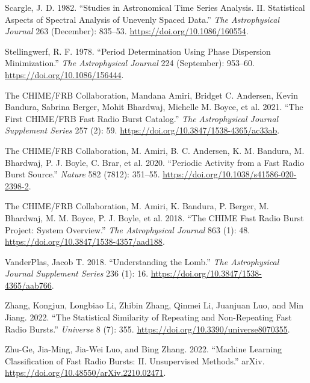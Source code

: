 \documentclass[
  rmp,
  amsmath,
  amssymb,
  preprint]{revtex4-2}
\newlength{\cslhangindent}
\newlength{\cslentryspacingunit} %
\newenvironment{CSLReferences}[2] %
 {%
  \setlength{\parindent}{0pt}
  \ifodd #1
  \let\oldpar\par
  \def\par{\hangindent=\cslhangindent\oldpar}
  \fi
  \setlength{\parskip}{#2\cslentryspacingunit}
 }%
 {}
\begin{document}
\begin{CSLReferences}{1}{0}
\leavevmode{}%
Scargle, J. D. 1982. {``Studies in Astronomical Time Series Analysis.
{II}. {Statistical} Aspects of Spectral Analysis of Unevenly Spaced
Data.''} \emph{The Astrophysical Journal} 263 (December): 835--53.
\url{https://doi.org/10.1086/160554}.

\leavevmode{}%
Stellingwerf, R. F. 1978. {``Period Determination Using Phase Dispersion
Minimization.''} \emph{The Astrophysical Journal} 224 (September):
953--60. \url{https://doi.org/10.1086/156444}.

\leavevmode{}%
The CHIME/FRB Collaboration, Mandana Amiri, Bridget C. Andersen, Kevin
Bandura, Sabrina Berger, Mohit Bhardwaj, Michelle M. Boyce, et al. 2021.
{``The {First CHIME}/{FRB Fast Radio Burst Catalog}.''} \emph{The
Astrophysical Journal Supplement Series} 257 (2): 59.
\url{https://doi.org/10.3847/1538-4365/ac33ab}.

\leavevmode{}%
The CHIME/FRB Collaboration, M. Amiri, B. C. Andersen, K. M. Bandura, M.
Bhardwaj, P. J. Boyle, C. Brar, et al. 2020. {``Periodic Activity from a
Fast Radio Burst Source.''} \emph{Nature} 582 (7812): 351--55.
\url{https://doi.org/10.1038/s41586-020-2398-2}.

\leavevmode{}%
The CHIME/FRB Collaboration, M. Amiri, K. Bandura, P. Berger, M.
Bhardwaj, M. M. Boyce, P. J. Boyle, et al. 2018. {``The {CHIME Fast
Radio Burst Project}: {System Overview}.''} \emph{The Astrophysical
Journal} 863 (1): 48. \url{https://doi.org/10.3847/1538-4357/aad188}.

\leavevmode{}%
VanderPlas, Jacob T. 2018. {``Understanding the
{Lomb}.''} \emph{The Astrophysical
Journal Supplement Series} 236 (1): 16.
\url{https://doi.org/10.3847/1538-4365/aab766}.

\leavevmode{}%
Zhang, Kongjun, Longbiao Li, Zhibin Zhang, Qinmei Li, Juanjuan Luo, and
Min Jiang. 2022. {``The {Statistical Similarity} of {Repeating} and
{Non-Repeating Fast Radio Bursts}.''} \emph{Universe} 8 (7): 355.
\url{https://doi.org/10.3390/universe8070355}.

\leavevmode{}%
Zhu-Ge, Jia-Ming, Jia-Wei Luo, and Bing Zhang. 2022. {``Machine
{Learning Classification} of {Fast Radio Bursts}: {II}. {Unsupervised
Methods}.''} {arXiv}. \url{https://doi.org/10.48550/arXiv.2210.02471}.

\end{CSLReferences}
\end{document}
